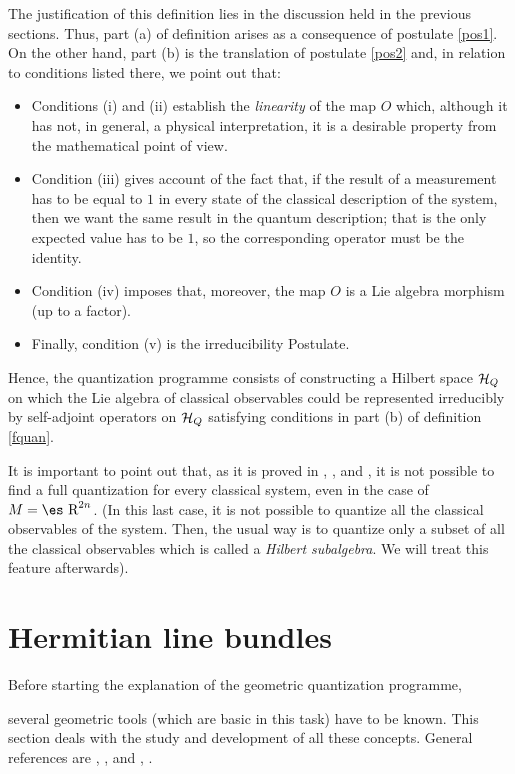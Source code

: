 \documentclass[12pt]{article}
\theoremstyle{plain}
\def\H{{\cal H}}
\def\Real{\mbox{\es R}}
\begin{document}
The justification of this definition lies in the discussion held in the
previous sections.
Thus, part (a) of definition arises as a consequence of postulate
\ref{pos1}.
On the other hand, part (b) is the translation of postulate
\ref{pos2} and, in relation to conditions listed there, we point out
that:
\begin{itemize}
\item
Conditions (i) and (ii) establish the {\it linearity} of the map $O$
which,
although it has not, in general, a physical interpretation,
it is a desirable property from the mathematical point of view.
\item
Condition (iii) gives account of the fact that,
if the result of a measurement has to be equal to $1$
in every state of the classical description of the system,
then we want the same result in the quantum description;
that is the only expected value has to be $1$, so the corresponding
operator must be the identity.
\item
Condition (iv) imposes that, moreover,
the map $O$ is a Lie algebra morphism (up to a factor).
\item
Finally, condition (v) is the irreducibility Postulate.
\end{itemize}

Hence, the quantization programme consists of constructing a Hilbert
space $\H_Q$
on which the Lie algebra of classical observables could be represented
irreducibly by self-adjoint operators on $\H_Q$
satisfying conditions in part (b) of definition \ref{fquan}.

It is important to point out that, as it is proved in
\cite{AM-78}, \cite{Go-80}, \cite{Gr-46} and \cite{Vh-51},
it is not possible to find a full quantization for every classical
system,
even in the case of $M=\Real^{2n}$. (In this last case, it is not
possible to quantize
all the classical observables of the system.
Then, the usual way is to quantize only a subset of all the classical
observables
which is called a {\it Hilbert subalgebra}. We will treat this feature
afterwards).



\section{Hermitian line bundles}


Before starting the explanation of the geometric quantization programme,

several geometric tools (which are basic in this task)
have to be known. This section deals with
the study and development of all these concepts.
General references are  \cite{Bl-gq}, \cite{Ga-83}, \cite{Ko-70} and
\cite{Wo-80}, .
\end{document}

